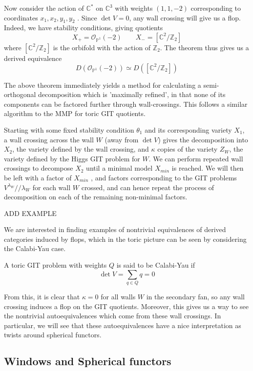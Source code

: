 \begin{example}{}{}
    Now consider the action of $\mathbb{C}^{*}$ on $\mathbb{C}^3$ with weights $(1,1,-2)$ corresponding to coordinates $x_{1},x_{2},y_1,y_2$ .  Since $\det V = 0$, any wall crossing will give us a flop. Indeed, we have stability conditions, giving quotients $$X_{+}= \mathcal{O}_{\mathbb{P}^{1}}(-2) \qquad X_{-}= [\mathbb{C}^{2}/ \mathbb{Z}_2]  $$where $[\mathbb{C}^2/\mathbb{Z}_2]$ is the orbifold with the action of $\mathbb{Z}_2$. The theorem thus gives us a derived equivalence $$D(\mathcal{O}_{\mathbb{P}^{1}}(-2))\simeq D([\mathbb{C}^{2}/\mathbb{Z}_{2}])$$
\end{example}


The above theorem immediately yields a method for calculating a semi-orthogonal decomposition which is 'maximally refined', in that none of its components can be factored further through wall-crossings. This follows a similar algorithm to the MMP for toric GIT quotients. 

Starting with some fixed stability condition $\theta _1$ and its corresponding variety $X_1$, a wall crossing across the wall $W$ (away from $\det V$) gives the decomposition into $X_2$, the variety defined by the wall crossing, and $\kappa$ copies of the variety $Z_W$, the variety defined by the Higgs GIT problem for $W$. We can perform repeated wall crossings to decompose $X_2$ until a minimal model $X_{min}$ is reached. We will then be left with a factor of $X_{min}$ , and factors corresponding to the GIT problems $V^{\lambda_{W}} / / \lambda_{W}$ for each wall $W$ crossed, and can hence repeat the process of decomposition on each of the remaining non-minimal factors.

ADD EXAMPLE

We are interested in finding examples of nontrivial equivalences of derived categories induced by flops, which in the toric picture can be seen by considering the Calabi-Yau case.

\begin{definition}{}{}
    A toric GIT problem with weights $Q$ is said to be Calabi-Yau if $$\det V = \sum_{q \in Q} q = 0$$
\end{definition}

From this, it is clear that $\kappa = 0$ for all walls $W$ in the secondary fan, so any wall crossing induces a flop on the GIT quotients. Moreover, this gives us a way to see the nontrivial autoequivalences which come from these wall crossings. In particular, we will see that these autoequivalences have a nice interpretation as twists around spherical functors. 

\subsection{Windows and Spherical functors}




